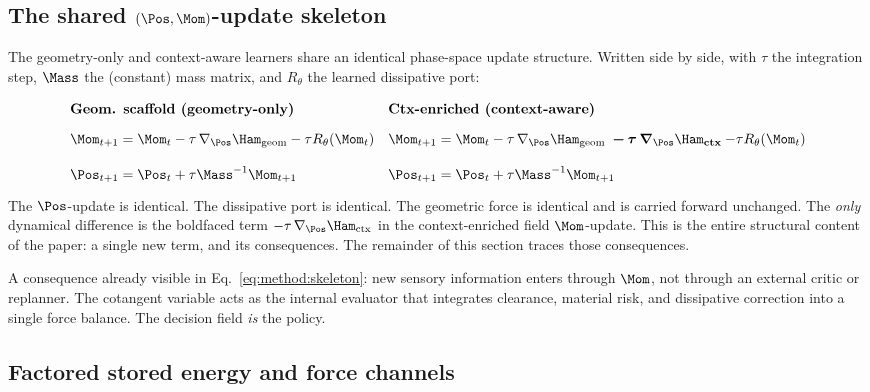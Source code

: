 \subsection{The shared $(\Pos,\Mom)$-update skeleton}
\label{sec:method:skeleton}

The geometry-only and context-aware learners share an identical
phase-space update structure. Written side by side, with $\tau$ the
integration step, $\Mass$ the (constant) mass matrix, and $R_\theta$
the learned dissipative port:
\begin{equation}
\renewcommand{\arraystretch}{1.6}
\begin{array}{ll}
\textbf{Geom. scaffold (geometry-only)} & \textbf{Ctx-enriched (context-aware)} \\[2pt]
\Mom_{t+1} = \Mom_t
  - \tau\,\nabla_\Pos \Ham_{\mathrm{geom}}
  - \tau R_\theta(\Mom_t)
&
\Mom_{t+1} = \Mom_t
  - \tau\,\nabla_\Pos \Ham_{\mathrm{geom}}
  \;\boldsymbol{-\,\tau\,\nabla_\Pos \Ham_{\mathrm{ctx}}}
  - \tau R_\theta(\Mom_t) \\[6pt]
\Pos_{t+1} = \Pos_t + \tau \Mass^{-1} \Mom_{t+1}
&
\Pos_{t+1} = \Pos_t + \tau \Mass^{-1} \Mom_{t+1}
\end{array}
\label{eq:method:skeleton}
\end{equation}
The $\Pos$-update is identical. The dissipative port is identical. The
geometric force is identical and is carried forward unchanged. The
\emph{only} dynamical difference is the boldfaced term
$-\tau\,\nabla_\Pos \Ham_{\mathrm{ctx}}$ in the context-enriched field $\Mom$-update.
This is the entire structural content of the paper: a single new term,
and its consequences. The remainder of this section traces those
consequences.

A consequence already visible in Eq.~\eqref{eq:method:skeleton}: new
sensory information enters through $\Mom$, not through an external
critic or replanner. The cotangent variable acts as the internal
evaluator that integrates clearance, material risk, and dissipative
correction into a single force balance. The decision field \emph{is}
the policy.

\subsection{Factored stored energy and force channels}
\label{sec:method:energy}

